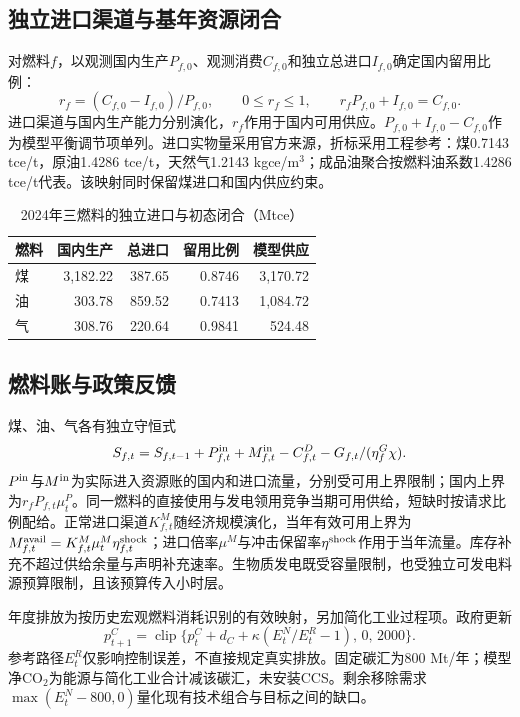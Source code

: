\subsection{独立进口渠道与基年资源闭合}
对燃料$f$，以观测国内生产$P_{f,0}$、观测消费$C_{f,0}$和独立总进口$I_{f,0}$确定国内留用比例：
\begin{equation}
r_f=(C_{f,0}-I_{f,0})/P_{f,0},\qquad 0\le r_f\le1,\qquad r_fP_{f,0}+I_{f,0}=C_{f,0}.
\end{equation}
进口渠道与国内生产能力分别演化，$r_f$作用于国内可用供应。$P_{f,0}+I_{f,0}-C_{f,0}$作为模型平衡调节项单列。进口实物量采用官方来源，折标采用工程参考：煤0.7143 tce/t，原油1.4286 tce/t，天然气1.2143 kgce/m$^3$\cite{ndrc_conversion,nbs_conversion}；成品油聚合按燃料油系数1.4286 tce/t代表。该映射同时保留煤进口和国内供应约束。

\begin{table}[H]\centering\caption{2024年三燃料的独立进口与初态闭合（Mtce）}
\begin{tabular}{lrrrr}\toprule
燃料 & 国内生产 & 总进口 & 留用比例 & 模型供应\\\midrule
煤 & 3,182.22 & 387.65 & 0.8746 & 3,170.72 \\
油 & 303.78 & 859.52 & 0.7413 & 1,084.72 \\
气 & 308.76 & 220.64 & 0.9841 & 524.48 \\
\bottomrule\end{tabular}\end{table}
\par
\subsection{燃料账与政策反馈}
煤、油、气各有独立守恒式
\begin{equation}
S_{f,t}=S_{f,t-1}+P^{\rm in}_{f,t}+M^{\rm in}_{f,t}-C^D_{f,t}-G_{f,t}/(\eta^G_f\chi).
\end{equation}
$P^{\rm in}$与$M^{\rm in}$为实际进入资源账的国内和进口流量，分别受可用上界限制；国内上界为$r_fP_{f,t}\mu^P_t$。同一燃料的直接使用与发电领用竞争当期可用供给，短缺时按请求比例配给。正常进口渠道$K^M_{f,t}$随经济规模演化，当年有效可用上界为$M^{\rm avail}_{f,t}=K^M_{f,t}\mu^M_t\eta^{\rm shock}_{f,t}$；进口倍率$\mu^M$与冲击保留率$\eta^{\rm shock}$作用于当年流量。库存补充不超过供给余量与声明补充速率。生物质发电既受容量限制，也受独立可发电料源预算限制，且该预算传入小时层。

年度排放为按历史宏观燃料消耗识别的有效映射，另加简化工业过程项。政府更新
\begin{equation}
p^C_{t+1}=\operatorname{clip}\{p^C_t+d_C+\kappa(E^N_t/E^R_t-1),\,0,\,2000\}.
\end{equation}
参考路径$E^R_t$仅影响控制误差，不直接规定真实排放。固定碳汇为800 Mt/年；模型净CO$_2$为能源与简化工业合计减该碳汇，未安装CCS。剩余移除需求$\max(E^N_t-800,0)$量化现有技术组合与目标之间的缺口。


